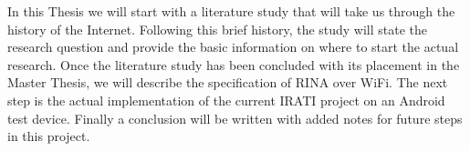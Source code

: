 \npar

In this Thesis we will start with a literature study that will take us through the history of the Internet. Following this brief history, the study will state the research question and provide the basic information on where to start the actual research. Once the literature study has been concluded with its placement in the Master Thesis, we will describe the specification of RINA over WiFi. The next step is the actual implementation of the current IRATI project on an Android test device. Finally a conclusion will be written with added notes for future steps in this project.